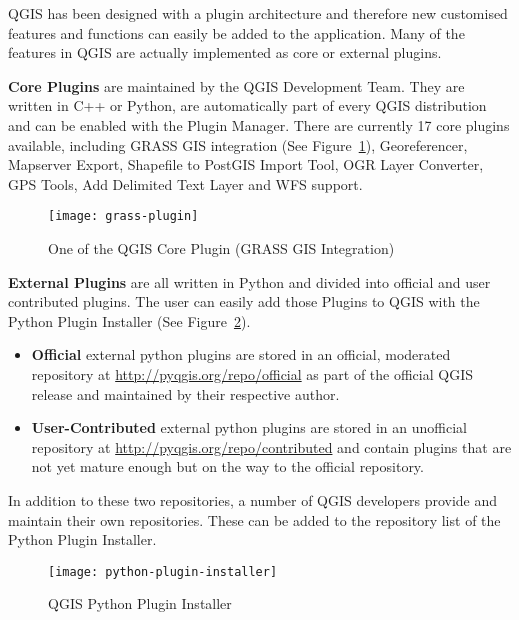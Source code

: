 QGIS has been designed with a plugin architecture and therefore new
customised features and functions can easily be added to the application.
Many of the features in QGIS are actually implemented as core or external
plugins. 

\textbf{Core Plugins} are maintained by the QGIS Development Team. They are
written in C++ or Python, are automatically part of every QGIS distribution
and can be enabled with the Plugin Manager. There are currently 17 core
plugins available, including GRASS GIS integration (See
Figure~\ref{fig:grass-plugin}), Georeferencer, Mapserver Export, Shapefile to
PostGIS Import Tool, OGR Layer Converter, GPS Tools, Add Delimited Text Layer
and WFS support.

\begin{figure}[h]
   \begin{center}
   \caption{One of the QGIS Core Plugin (GRASS GIS Integration)}
    \label{fig:grass-plugin}\smallskip
   \texttt{[image: grass-plugin]}
\end{center}
\end{figure}

\textbf{External Plugins} are all written in Python and divided into official
and user contributed plugins. The user can easily add those Plugins to QGIS
with the Python Plugin Installer (See Figure~\ref{fig:python-plugin}).

\begin{itemize}
\item \textbf{Official} external python plugins are stored in an official,
moderated repository at \url{http://pyqgis.org/repo/official} as part of the
official QGIS release and maintained by their respective author.
\item \textbf{User-Contributed} external python plugins are stored in an
unofficial repository at \url{http://pyqgis.org/repo/contributed} and contain
plugins that are not yet mature enough but on the way to the official
repository.
\end{itemize}

In addition to these two repositories, a number of QGIS developers provide and
maintain
their own repositories. These can be added to the repository list of the
Python Plugin Installer.

\begin{figure}[h]
   \begin{center}
   \caption{QGIS Python Plugin Installer}\label{fig:python-plugin}\smallskip
   \texttt{[image: python-plugin-installer]}
\end{center}
\end{figure}

